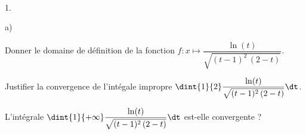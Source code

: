 \documentclass[11pt]{article}%
\begin{document}
\begin{exerciceSP}~
  \begin{noliste}{1.}
  \item
    \begin{noliste}{a)}
    \item Donner le domaine de définition de la fonction $f : x
      \mapsto \dfrac{\ln(t)}{\sqrt{ (t-1)^2 \, (2-t)}}$.
      
    \item Justifier la convergence de l'intégale impropre $\dint{1}{2}
      \dfrac{\ln(t)}{\sqrt{ (t-1)^2 \, (2-t)}} \dt$.
    \end{noliste}
    
  \item L'intégrale $\dint{1}{+\infty} \dfrac{\ln(t)}{\sqrt{ (t-1)^2
        \, (2-t)}} \dt$ est-elle convergente ?
  \end{noliste}
\end{exerciceSP}

\end{document}
